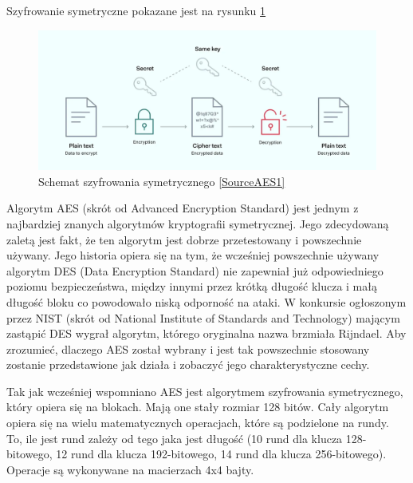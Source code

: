 Szyfrowanie symetryczne pokazane jest na rysunku \ref{fig:AES1}
\begin{figure}[H]
    \centering
    \includegraphics[width=\textwidth]{Images/AES1.png}
    \caption{Schemat szyfrowania symetrycznego \ref{SourceAES1}}
    \label{fig:AES1}
\end{figure}
Algorytm AES (skrót od Advanced Encryption Standard) jest jednym z najbardziej znanych algorytmów kryptografii symetrycznej. Jego zdecydowaną zaletą jest fakt, że ten algorytm jest dobrze przetestowany i powszechnie używany. Jego historia opiera się na tym, że wcześniej powszechnie używany algorytm DES (Data Encryption Standard) nie zapewniał już odpowiedniego poziomu bezpieczeństwa, między innymi przez krótką długość klucza i małą długość bloku co powodowało niską odporność na ataki. W konkursie ogłoszonym przez NIST (skrót od National Institute of Standards and Technology) mającym zastąpić DES wygrał algorytm, którego oryginalna nazwa brzmiała Rijndael. Aby zrozumieć, dlaczego AES został wybrany i jest tak powszechnie stosowany zostanie przedstawione jak działa i zobaczyć jego charakterystyczne cechy.

\vspace{0.3\baselineskip}

Tak jak wcześniej wspomniano AES jest algorytmem szyfrowania symetrycznego, który opiera się na blokach. Mają one stały rozmiar 128 bitów. Cały algorytm opiera się na wielu matematycznych operacjach, które są podzielone na rundy. To, ile jest rund zależy od tego jaka jest długość (10 rund dla klucza 128-bitowego, 12 rund dla klucza 192-bitowego, 14 rund dla klucza 256-bitowego). Operacje są wykonywane na macierzach 4x4 bajty.

\vspace{0.3\baselineskip}

